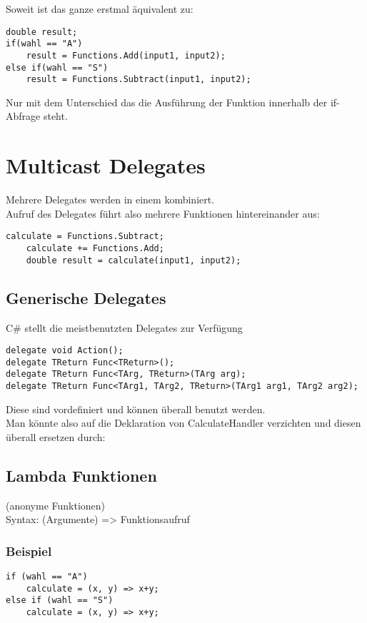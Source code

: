 Soweit ist das ganze erstmal äquivalent zu: 
\begin{lstlisting}[language={[Sharp]C}]
double result;
if(wahl == "A")	
	result = Functions.Add(input1, input2);
else if(wahl == "S")
	result = Functions.Subtract(input1, input2);
\end{lstlisting}

Nur mit dem Unterschied das die Ausführung der Funktion innerhalb der if-Abfrage steht. 

\section{Multicast Delegates}
Mehrere Delegates werden in einem kombiniert.\\
Aufruf des Delegates führt also mehrere Funktionen hintereinander aus:
\begin{lstlisting}[language={[Sharp]C}]
	calculate = Functions.Subtract;
	calculate += Functions.Add;
	double result = calculate(input1, input2);
\end{lstlisting}

\subsection{Generische Delegates}
C\# stellt die meistbenutzten Delegates zur Verfügung

\begin{lstlisting}[language={[Sharp]C}]
delegate void Action();
delegate TReturn Func<TReturn>();
delegate TReturn Func<TArg, TReturn>(TArg arg);
delegate TReturn Func<TArg1, TArg2, TReturn>(TArg1 arg1, TArg2 arg2); 
\end{lstlisting}
Diese sind vordefiniert und können überall benutzt werden.\\
Man könnte also auf die Deklaration von CalculateHandler verzichten und diesen überall ersetzen durch:


\subsection{Lambda Funktionen}
(anonyme Funktionen)\\
Syntax:  (Argumente) => Funktionsaufruf

\subsubsection*{Beispiel}
\begin{lstlisting}[language={[Sharp]C}]
if (wahl == "A")
	calculate = (x, y) => x+y;
else if (wahl == "S")
	calculate = (x, y) => x+y;
\end{lstlisting}


